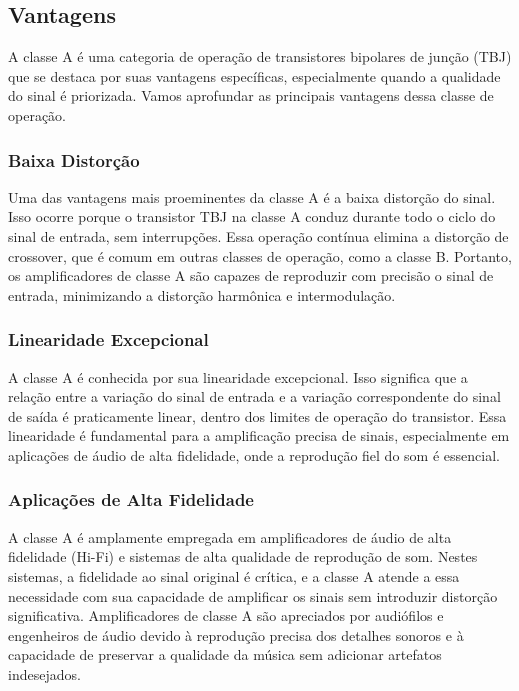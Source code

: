 \subsection{Vantagens}

A classe A é uma categoria de operação de transistores bipolares de junção (TBJ) que se destaca por suas vantagens específicas, especialmente quando a qualidade do sinal é priorizada. Vamos aprofundar as principais vantagens dessa classe de operação.

\subsubsection{Baixa Distorção}

Uma das vantagens mais proeminentes da classe A é a baixa distorção do sinal. Isso ocorre porque o transistor TBJ na classe A conduz durante todo o ciclo do sinal de entrada, sem interrupções. Essa operação contínua elimina a distorção de crossover, que é comum em outras classes de operação, como a classe B. Portanto, os amplificadores de classe A são capazes de reproduzir com precisão o sinal de entrada, minimizando a distorção harmônica e intermodulação.

\subsubsection{Linearidade Excepcional}

A classe A é conhecida por sua linearidade excepcional. Isso significa que a relação entre a variação do sinal de entrada e a variação correspondente do sinal de saída é praticamente linear, dentro dos limites de operação do transistor. Essa linearidade é fundamental para a amplificação precisa de sinais, especialmente em aplicações de áudio de alta fidelidade, onde a reprodução fiel do som é essencial.

\subsubsection{Aplicações de Alta Fidelidade}

A classe A é amplamente empregada em amplificadores de áudio de alta fidelidade (Hi-Fi) e sistemas de alta qualidade de reprodução de som. Nestes sistemas, a fidelidade ao sinal original é crítica, e a classe A atende a essa necessidade com sua capacidade de amplificar os sinais sem introduzir distorção significativa. Amplificadores de classe A são apreciados por audiófilos e engenheiros de áudio devido à reprodução precisa dos detalhes sonoros e à capacidade de preservar a qualidade da música sem adicionar artefatos indesejados.

